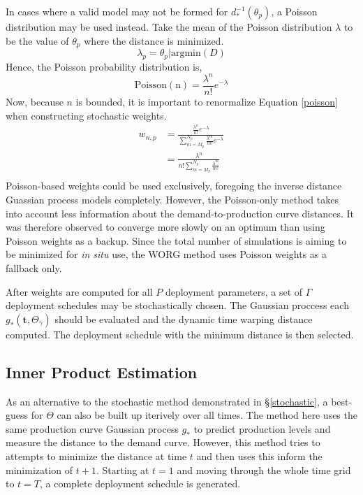 In cases where a valid model may not be formed for $d_*^{-1}(\theta_p)$, 
a Poisson distribution may be used instead.  Take the mean of the Poisson
distribution $\lambda$ to be the value of $\theta_p$ where the distance
is minimized.
\begin{equation}
\label{lambda}
\lambda_p = \theta_p | \mathrm{argmin}(D) 
\end{equation}
Hence, the Poisson probability distribution is, 
\begin{equation}
\label{poisson}
\mathrm{Poisson(n)} = \frac{\lambda^n}{n!} e^{-\lambda}
\end{equation}
Now, because $n$ is bounded, it is important to renormalize Equation 
\ref{poisson} when constructing stochastic weights.
\begin{equation}
\label{poisson-w}
\begin{split}
w_{n,p} & = \frac{\frac{\lambda^n}{n!} e^{-\lambda}}
                 {\sum_{m=M_p}^{N_p} \frac{\lambda^m}{m!} e^{-\lambda}}\\
        & = \frac{\lambda^n}
                 {n!\sum_{m=M_p}^{N_p} \frac{\lambda^m}{m!}}\\
\end{split}
\end{equation}
Poisson-based weights could be used exclusively, foregoing the inverse 
distance Guassian process models completely. However, the Poisson-only 
method takes into account less information about the demand-to-production
curve distances.  It was therefore observed to converge more slowly 
on an optimum than using Poisson weights as a backup.  Since the total 
number of simulations is aiming to be minimized for \emph{in situ} use, 
the WORG method uses Poisson weights as a fallback only.

After weights are computed for all $P$ deployment parameters, a set of 
$\Gamma$ deployment schedules may be stochastically chosen. The Gaussian
proccess each $g_*(\mathbf{t}, \Theta_\gamma)$ should be evaluated and the
dynamic time warping distance computed. The deployment schedule with 
the minimum distance is then selected.



\subsection{Inner Product Estimation}
\label{inner-prod}

As an alternative to the stochastic method demonstrated in \S\ref{stochastic}, 
a best-guess for $\Theta$ can also be built up iterively over all times.
The method here uses the same production curve Gaussian process $g_*$ to 
predict production levels and measure the distance to the demand curve.
However, this method tries to attempts to minimize the distance at time
$t$ and then uses this inform the minimization of $t+1$. Starting at $t=1$
and moving through the whole time grid to $t=T$, a complete deployment 
schedule is generated.

